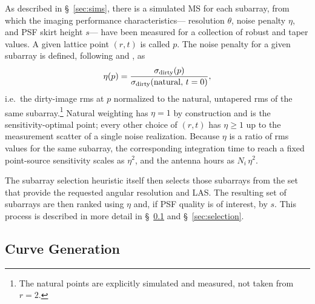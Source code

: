 \documentclass[11pt]{article}
\begin{document}
As described in \S~\ref{sec:sims}, there is a simulated MS for each
subarray, from which the imaging performance characteristics---
resolution $\theta$, noise penalty $\eta$, and PSF skirt height $s$---
have been measured for a collection of robust and taper values.  A
given lattice point $(r,t)$ is called $p$.  The noise penalty for a
given subarray is defined, following \citep{memo55} and
\citep{memo121}, as
\begin{equation}
  \eta(p) = \frac{\sigma_{\rm dirty}(p)}{\sigma_{\rm dirty}({\rm natural},\,t=0)} ,
\end{equation}
i.e.\ the dirty-image rms at $p$ normalized to the natural,
untapered rms of the same subarray.\footnote{The natural points are
explicitly simulated and measured, not taken from $r=2$.}  Natural
weighting has $\eta = 1$ by construction and is the
sensitivity-optimal point; every other choice of $(r,t)$ has
$\eta \ge 1$ up to the measurement scatter of a single noise
realization.  Because $\eta$ is a ratio of rms values for the same
subarray, the corresponding integration time to reach a fixed
point-source sensitivity scales as $\eta^2$, and the antenna hours as
$N_i\,\eta^2$.

The subarray selection heuristic itself then selects those subarrays
from the set that provide the requested angular resolution and LAS.
The resulting set of subarrays are then ranked using $\eta$ and, if
PSF quality is of interest, by $s$. This process is described in
more detail in \S~\ref{sec:curvegen} and \S~\ref{sec:selection}.


\subsection{Curve Generation}
\label{sec:curvegen}
\end{document}
